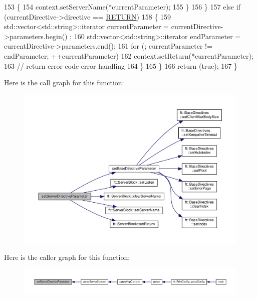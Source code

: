 \begin{DoxyCode}
153                 \{
154                     context.setServerName(*currentParameter);
155                 \}
156             \}
157             \textcolor{keywordflow}{else} \textcolor{keywordflow}{if} (currentDirective->directive == \hyperlink{namespaceft_a5a5554dff10f0dc50bae4cc5825ad75da520e09ffec033636dba711f3441cc600}{RETURN})
158             \{
159                 std::vector<std::string>::iterator  currentParameter = currentDirective->parameters.begin()
      ;
160                 std::vector<std::string>::iterator      endParameter = currentDirective->parameters.end();
161                 \textcolor{keywordflow}{for} (; currentParameter != endParameter; ++currentParameter)
162                     context.setReturn(*currentParameter);
163                 \textcolor{comment}{// return error code error handling}
164             \}
165         \}
166         \textcolor{keywordflow}{return} (\textcolor{keyword}{true});
167     \}
\end{DoxyCode}
Here is the call graph for this function\+:
\nopagebreak
\begin{figure}[H]
\begin{center}
\leavevmode
\includegraphics[width=350pt]{classft_1_1_parser_a18c1b12280ce1a16246a8ba09156116f_cgraph}
\end{center}
\end{figure}
Here is the caller graph for this function\+:
\nopagebreak
\begin{figure}[H]
\begin{center}
\leavevmode
\includegraphics[width=350pt]{classft_1_1_parser_a18c1b12280ce1a16246a8ba09156116f_icgraph}
\end{center}
\end{figure}


